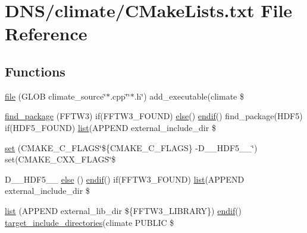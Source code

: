 \hypertarget{climate_2_c_make_lists_8txt}{}\section{D\+N\+S/climate/\+C\+Make\+Lists.txt File Reference}
\label{climate_2_c_make_lists_8txt}
\subsection*{Functions}
\begin{DoxyCompactItemize}
\item 
\hyperlink{climate_2_c_make_lists_8txt_a6063d0ad1cb28fb9e79eeb34e1743b9b}{file} (G\+L\+OB climate\+\_\+source\char`\"{}$\ast$.cpp\char`\"{}\char`\"{}$\ast$.h\char`\"{}) add\+\_\+executable(climate \$
\item 
\hyperlink{climate_2_c_make_lists_8txt_acded747334bf7406ae368a99dffecd49}{find\+\_\+package} (F\+F\+T\+W3) if(F\+F\+T\+W3\+\_\+\+F\+O\+U\+ND) \hyperlink{solver_2_c_make_lists_8txt_a844b84ee1f5598a5fc8a8eb854f06875}{else}() \hyperlink{src_2_c_make_lists_8txt_aef342c7d9b2e3710bae20e89a22eca4e}{endif}() find\+\_\+package(H\+D\+F5) if(H\+D\+F5\+\_\+\+F\+O\+U\+ND) \hyperlink{climate_2_c_make_lists_8txt_a30dc08d289bd92b4ef9fcbaeea9460c2}{list}(A\+P\+P\+E\+ND external\+\_\+include\+\_\+dir \$
\item 
\hyperlink{climate_2_c_make_lists_8txt_a55b0ad685d34346bc1f0719a5d17233a}{set} (C\+M\+A\+K\+E\+\_\+\+C\+\_\+\+F\+L\+A\+GS\char`\"{}\$\{C\+M\+A\+K\+E\+\_\+\+C\+\_\+\+F\+L\+A\+GS\} -\/D\+\_\+\+\_\+\+H\+D\+F5\+\_\+\+\_\+\char`\"{}) set(C\+M\+A\+K\+E\+\_\+\+C\+X\+X\+\_\+\+F\+L\+A\+GS\char`\"{}\$
\item 
D\+\_\+\+\_\+\+H\+D\+F5\+\_\+\+\_\+ \hyperlink{climate_2_c_make_lists_8txt_a3f58d3af0c5f3ad8f3bd2dbb6df4ec02}{else} () \hyperlink{src_2_c_make_lists_8txt_aef342c7d9b2e3710bae20e89a22eca4e}{endif}() if(F\+F\+T\+W3\+\_\+\+F\+O\+U\+ND) \hyperlink{climate_2_c_make_lists_8txt_a30dc08d289bd92b4ef9fcbaeea9460c2}{list}(A\+P\+P\+E\+ND external\+\_\+include\+\_\+dir \$
\item 
\hyperlink{climate_2_c_make_lists_8txt_a30dc08d289bd92b4ef9fcbaeea9460c2}{list} (A\+P\+P\+E\+ND external\+\_\+lib\+\_\+dir \$\{F\+F\+T\+W3\+\_\+\+L\+I\+B\+R\+A\+RY\}) \hyperlink{src_2_c_make_lists_8txt_aef342c7d9b2e3710bae20e89a22eca4e}{endif}() \hyperlink{src_2_c_make_lists_8txt_a2e1c33df697410b7bcdbd2f39c8417e5}{target\+\_\+include\+\_\+directories}(climate P\+U\+B\+L\+IC \$
\end{DoxyCompactItemize}



